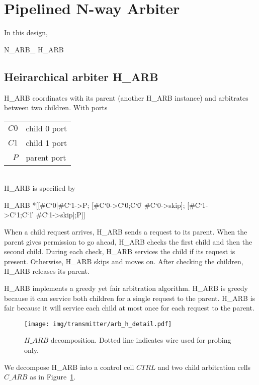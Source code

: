 \documentclass[aer.tex]{subfiles}
\begin{document}
\section{Pipelined N-way Arbiter}

In this design, 

\begin{csp}
N\_ARB\_ \equiv H\_ARB
\end{csp}
\subsection{Heirarchical arbiter H\_ARB}

H\_ARB coordinates with its parent (another H\_ARB instance) and arbitrates between two children. 
With ports

\begin{tabular}[]{rl}
$C0$ & child 0 port \\
$C1$ & child 1 port \\
$P$ & parent port \\
\end{tabular} \\

\noindent H\_ARB is specified by

\begin{csp}
H_ARB\equiv
  *[[#{C`0}|#{C`1}->P;
    [#{C`0}->C`0;C`0\|~#{C`0}->skip];
    [#{C`1}->C`1;C`1\|~#{C`1}->skip];P]]
\end{csp}

When a child request arrives, H\_ARB sends a request to its parent. When the parent gives permission to go ahead, H\_ARB checks the first child and then the second child. During each check, H\_ARB services the child if its request is present. Otherwise, H\_ARB skips and moves on. After checking the children, H\_ARB releases its parent.

H\_ARB implements a greedy yet fair arbitration algorithm. H\_ARB is greedy because it can service both children for a single request to the parent. H\_ARB is fair because it will service each child at most once for each request to the parent. 

\begin{figure}
  \centering
  \texttt{[image: img/transmitter/arb\_h\_detail.pdf]}
  \caption{$H\_ARB$ decomposition. Dotted line indicates wire used for probing only.}
  \label{fig:h_arb_detail}
\end{figure}

We decompose H\_ARB into a control cell $CTRL$ and two child arbitration cells $C\_ARB$ as in Figure~\ref{fig:h_arb_detail}.
\end{document}
